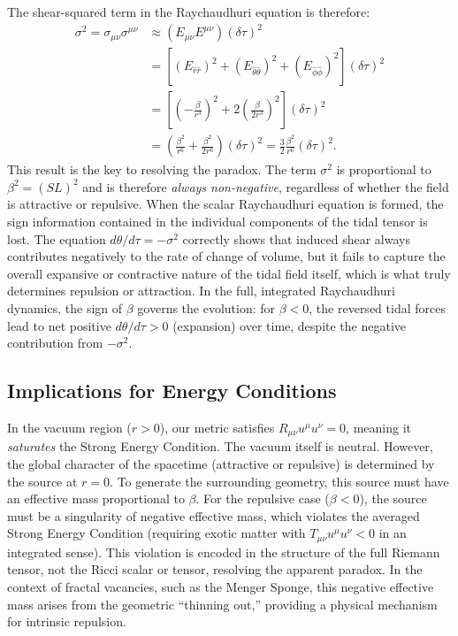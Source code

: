 \documentclass[%
  reprint,
  superscriptaddress,
  showpacs,
  showkeys,
  amsmath,amssymb,
  pra,
  longbibliography,
  floatfix,
  x11names
]{revtex4-2}
\begin{document}
The shear-squared term in the Raychaudhuri equation is therefore:
\begin{align}
\sigma^2 = \sigma_{\mu\nu}\sigma^{\mu\nu} &\approx (E_{\mu\nu}E^{\mu\nu}) (\delta\tau)^2 \nonumber \\
&= \left[ (E_{\hat{r}\hat{r}})^2 + (E_{\hat{\theta}\hat{\theta}})^2 + (E_{\hat{\phi}\hat{\phi}})^2 \right] (\delta\tau)^2 \nonumber \\
&= \left[ \left(-\frac{\beta}{r^3}\right)^2 + 2\left(\frac{\beta}{2r^3}\right)^2 \right] (\delta\tau)^2 \nonumber \\
&= \left( \frac{\beta^2}{r^6} + \frac{\beta^2}{2r^6} \right) (\delta\tau)^2 = \frac{3}{2}\frac{\beta^2}{r^6}(\delta\tau)^2.
\end{align}
This result is the key to resolving the paradox. The term $\sigma^2$ is proportional to $\beta^2 = (SL)^2$ and is therefore \emph{always non-negative}, regardless of whether the field is attractive or repulsive. When the scalar Raychaudhuri equation is formed, the sign information contained in the individual components of the tidal tensor is lost. The equation $d\theta/d\tau = -\sigma^2$ correctly shows that induced shear always contributes negatively to the rate of change of volume, but it fails to capture the overall expansive or contractive nature of the tidal field itself, which is what truly determines repulsion or attraction. In the full, integrated Raychaudhuri dynamics, the sign of $\beta$ governs the evolution: for $\beta < 0$, the reversed tidal forces lead to net positive $d\theta/d\tau > 0$ (expansion) over time, despite the negative contribution from $-\sigma^2$.

\subsection{Implications for Energy Conditions}
In the vacuum region ($r > 0$), our metric satisfies $R_{\mu\nu} u^\mu u^\nu = 0$, meaning it \emph{saturates} the Strong Energy Condition. The vacuum itself is neutral. However, the global character of the spacetime (attractive or repulsive) is determined by the source at $r=0$. To generate the surrounding geometry, this source must have an effective mass proportional to $\beta$. For the repulsive case ($\beta < 0$), the source must be a singularity of negative effective mass, which violates the averaged Strong Energy Condition (requiring exotic matter with $T_{\mu\nu} u^\mu u^\nu < 0$ in an integrated sense). This violation is encoded in the structure of the full Riemann tensor, not the Ricci scalar or tensor, resolving the apparent paradox. In the context of fractal vacancies, such as the Menger Sponge, this negative effective mass arises from the geometric ``thinning out,'' providing a physical mechanism for intrinsic repulsion.



\end{document}
